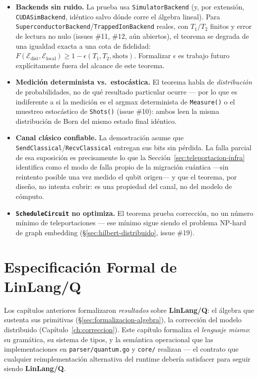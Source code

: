 \documentclass[12pt, a4paper, openany]{report}
\theoremstyle{definition}
\newcommand{\linlangQ}{\textbf{LinLang/Q}}
\begin{document}
\begin{itemize}
  \item \textbf{Backends sin ruido.} La prueba usa \texttt{SimulatorBackend} (y, por extensión, \texttt{CUDASimBackend}, idéntico salvo dónde corre el álgebra lineal). Para \texttt{SuperconductorBackend}/\texttt{TrappedIonBackend} reales, con $T_1/T_2$ finitos y error de lectura no nulo (issues \#11, \#12, aún abiertos), el teorema se degrada de una igualdad exacta a una cota de fidelidad: $F(\mathcal{E}_{\text{dist}}, \mathcal{E}_{\text{local}}) \geq 1 - \epsilon(T_1, T_2, \text{shots})$. Formalizar $\epsilon$ es trabajo futuro explícitamente fuera del alcance de este teorema.
  \item \textbf{Medición determinista vs.\ estocástica.} El teorema habla de \emph{distribución} de probabilidades, no de qué resultado particular ocurre — por lo que es indiferente a si la medición es el argmax determinista de \texttt{Measure()} o el muestreo estocástico de \texttt{Shots()} (issue \#10): ambos leen la misma distribución de Born del mismo estado final idéntico.
  \item \textbf{Canal clásico confiable.} La demostración asume que \texttt{SendClassical}/\texttt{RecvClassical} entregan sus bits sin pérdida. La falla parcial de esa suposición es precisamente lo que la Sección~\ref{sec:teleportacion-infra} identifica como el modo de falla propio de la migración cuántica —sin reintento posible una vez medido el qubit origen— y que el teorema, por diseño, no intenta cubrir: es una propiedad del canal, no del modelo de cómputo.
  \item \textbf{\texttt{ScheduleCircuit} no optimiza.} El teorema prueba corrección, no un número mínimo de teleportaciones — ese mínimo sigue siendo el problema NP-hard de graph embedding (\S\ref{sec:hilbert-distribuido}, issue \#19).
\end{itemize}

\chapter{Especificación Formal de \linlangQ{}}
\label{ch:especificacion}

Los capítulos anteriores formalizaron \emph{resultados} sobre \linlangQ{}: el álgebra que sustenta sus primitivas (\S\ref{sec:formalizacion-algebra}), la corrección del modelo distribuido (Capítulo~\ref{ch:correccion}). Este capítulo formaliza el \emph{lenguaje mismo}: su gramática, su sistema de tipos, y la semántica operacional que las implementaciones en \texttt{parser/quantum.go} y \texttt{core/} realizan — el contrato que cualquier reimplementación alternativa del runtime debería satisfacer para seguir siendo \linlangQ{}.
\end{document}
